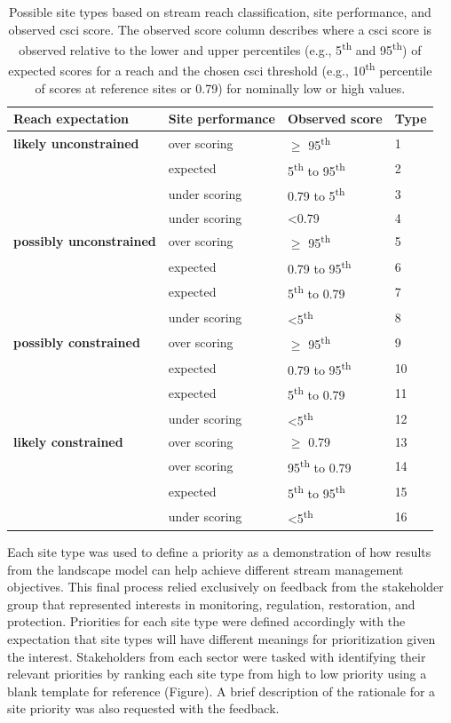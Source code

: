 \documentclass[]{article}
\begin{document}
\begin{table}[!tbp]
\caption{Possible site types based on stream reach classification, site performance, and observed \ac{csci} score. The observed score column describes where a \ac{csci} score is observed relative to the lower and upper percentiles (e.g., 5\textsuperscript{th} and 95\textsuperscript{th}) of expected scores for a reach and the chosen \ac{csci} threshold (e.g., 10\textsuperscript{th} percentile of scores at reference sites or 0.79) for nominally low or high values.\label{tab:typetab}} 
\begin{center}
\begin{tabular}{llll}
\hline\hline
\multicolumn{1}{l}{Reach expectation}&\multicolumn{1}{c}{Site performance}&\multicolumn{1}{c}{Observed score}&\multicolumn{1}{c}{Type}\tabularnewline
\hline
\textbf{likely unconstrained}&over scoring&$\geq$ 95\textsuperscript{th}&1\tabularnewline
&expected&5\textsuperscript{th} to 95\textsuperscript{th}&2\tabularnewline
&under scoring&0.79 to 5\textsuperscript{th}&3\tabularnewline
&under scoring&\textless  0.79&4\tabularnewline
\textbf{possibly unconstrained}&over scoring&$\geq$ 95\textsuperscript{th}&5\tabularnewline
&expected&0.79 to 95\textsuperscript{th}&6\tabularnewline
&expected&5\textsuperscript{th} to 0.79&7\tabularnewline
&under scoring&\textless  5\textsuperscript{th}&8\tabularnewline
\textbf{possibly constrained}&over scoring&$\geq$ 95\textsuperscript{th}&9\tabularnewline
&expected&0.79 to 95\textsuperscript{th}&10\tabularnewline
&expected&5\textsuperscript{th} to 0.79&11\tabularnewline
&under scoring&\textless  5\textsuperscript{th}&12\tabularnewline
\textbf{likely constrained}&over scoring&$\geq$ 0.79&13\tabularnewline
&over scoring&95\textsuperscript{th} to 0.79&14\tabularnewline
&expected&5\textsuperscript{th} to 95\textsuperscript{th}&15\tabularnewline
&under scoring&\textless  5\textsuperscript{th}&16\tabularnewline
\hline
\end{tabular}\end{center}
\end{table}

Each site type was used to define a priority as a demonstration of how
results from the landscape model can help achieve different stream
management objectives. This final process relied exclusively on feedback
from the stakeholder group that represented interests in monitoring,
regulation, restoration, and protection. Priorities for each site type
were defined accordingly with the expectation that site types will have
different meanings for prioritization given the interest. Stakeholders
from each sector were tasked with identifying their relevant priorities
by ranking each site type from high to low priority using a blank
template for reference (Figure). A brief description of the rationale
for a site priority was also requested with the feedback.
\end{document}
